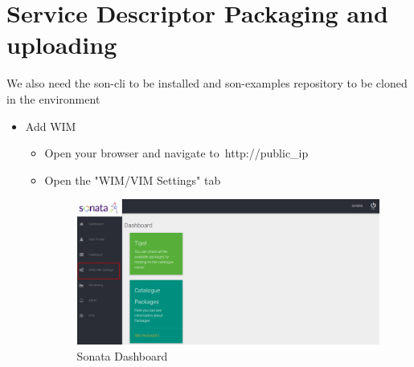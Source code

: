 	\section{Service Descriptor Packaging and uploading}
	\label{sec:Service Descriptor Packaging and uploading}
	We also need the son-cli to be installed and son-examples repository to be cloned in the environment
	\begin{itemize}
		\item Add WIM
		\begin{itemize}
			\item Open your browser and navigate to http://public\_ip
			\item Open the "WIM/VIM Settings" tab
			\begin{figure} [h]
				\centering
				\includegraphics[width=0.7\linewidth]{figures/LinkingStep1}
				\caption{Sonata Dashboard}
				\label{fig:linkingstep1}
			\end{figure}
			

\end{itemize}
\end{itemize}
